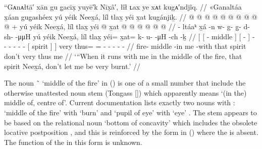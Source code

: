 \ex\label{ex:91-71-when-run-in-fire-dont-let-burn}%
%
\begingl
	\glpreamble	“Gᴀnᴀłtā′ xān gu g̣acīx̣ yuyē′k Nīx̣â′, łîł ʟax ye xᴀt kugᴀ′ndjîq. //
	\glpreamble	«\!Ganaltáa x̱áan gug̱ashéex yú yéik Neex̱á, líl tlax̱ yéi x̱at kugánjiḵ. //
	\gla	{} {}  @ {} @ {} {}
			{}  @ {} {}
			 @ {} @ {} @ {} @ {} @ {} @ {} @ {} +
			{} yú yéik Neex̱á, {} {}
		líl tlax̱ yéi @ x̱at @  @ {} @ {} @ {} @ {} @ {} //
	\glb	{} {} - ltáaᵏ {} {}
			{} x̱á -n {}
			w- g- g̱- d- sh-  -μμH {}
			{} yú yéik Neex̱á, {} {}
		líl tlax̱ yéi= x̱at= k- u-  -μH -ch -ḵ //
	\glc	{}[ {}[ - middle \· {}]
			{}[  - {}]
			- - - - -  - \·
			{}[  spirit  {}] {}]
		 very thus= = - -  - - - //
	\gld	{} {} fire- middle -in {}
			{} me -with {}
			 {} {} {} {} {} {} {}
			{} that spirit  {} {}
		don’t very thus me  {} {} {} {} {} //
	\glft	‘“When it runs with me in the middle of the fire, that spirit Neex̱á, don’t let me be very burnt.’
		//
\endgl
\xe

The noun  \~\  ‘middle of the fire’ in (\lastx) is one of a small number that include the otherwise unattested noun stem  (Tongass  []) which apparently means ‘(in the) middle of, centre of’.
Current documentation lists exactly two nouns with :  ‘middle of the fire’ with  ‘burn’ \parencite[f05/17]{leer:1973} and  ‘pupil of eye’ with  ‘eye’ \parencite[03/278–279]{leer:1973}.
The stem  appears to be based on the relational noun  ‘bottom of concavity’ which includes the obsolete locative postposition , and this is reinforced by the form in (\lastx) where the  is absent.
The function of the  in this form is unknown.

